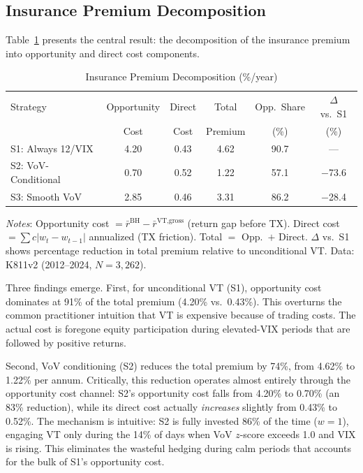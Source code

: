 \documentclass[12pt,a4paper]{article}
\begin{document}
\subsection{Insurance Premium Decomposition}

Table~\ref{tab:decomposition} presents the central result: the decomposition of the insurance premium into opportunity and direct cost components.

\begin{table}[H]
\centering
\begin{threeparttable}
\caption{Insurance Premium Decomposition (\%/year)}
\label{tab:decomposition}
\begin{tabular}{lccccc}
\toprule
Strategy & Opportunity & Direct & Total & Opp.\ Share & $\Delta$ vs.\ S1 \\
 & Cost & Cost & Premium & (\%) & (\%) \\
\midrule
S1: Always 12/VIX & 4.20 & 0.43 & 4.62 & 90.7 & --- \\
S2: VoV-Conditional & 0.70 & 0.52 & 1.22 & 57.1 & $-$73.6 \\
S3: Smooth VoV & 2.85 & 0.46 & 3.31 & 86.2 & $-$28.4 \\
\bottomrule
\end{tabular}
\begin{tablenotes}
\small
\item \textit{Notes}: Opportunity cost $= \bar{r}^{\text{BH}} - \bar{r}^{\text{VT,gross}}$ (return gap before TX). Direct cost $= \sum c|w_t - w_{t-1}|$ annualized (TX friction). Total $=$ Opp.\ $+$ Direct. $\Delta$ vs.\ S1 shows percentage reduction in total premium relative to unconditional VT. Data: K811v2 (2012--2024, $N = 3{,}262$).
\end{tablenotes}
\end{threeparttable}
\end{table}

Three findings emerge. First, for unconditional VT (S1), opportunity cost dominates at 91\% of the total premium (4.20\% vs.\ 0.43\%). This overturns the common practitioner intuition that VT is expensive because of trading costs. The actual cost is foregone equity participation during elevated-VIX periods that are followed by positive returns.

Second, VoV conditioning (S2) reduces the total premium by 74\%, from 4.62\% to 1.22\% per annum. Critically, this reduction operates almost entirely through the opportunity cost channel: S2's opportunity cost falls from 4.20\% to 0.70\% (an 83\% reduction), while its direct cost actually \emph{increases} slightly from 0.43\% to 0.52\%. The mechanism is intuitive: S2 is fully invested 86\% of the time ($w = 1$), engaging VT only during the 14\% of days when VoV $z$-score exceeds 1.0 and VIX is rising. This eliminates the wasteful hedging during calm periods that accounts for the bulk of S1's opportunity cost.
\end{document}
